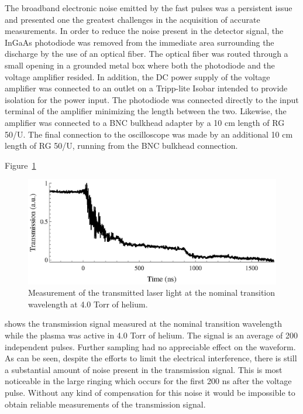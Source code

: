 The broadband electronic noise emitted by the fast pulses was a persistent issue
and presented one the greatest challenges in the acquisition of accurate
measurements. In order to reduce the noise present in the detector signal, the
InGaAs photodiode was removed from the immediate area surrounding the discharge
by the use of an optical fiber. The optical fiber was routed through a small
opening in a grounded metal box where both the photodiode and the voltage
amplifier resided. In addition, the DC power supply of the voltage amplifier was
connected to an outlet on a Tripp-lite Isobar intended to provide isolation for
the power input. The photodiode was connected directly to the input terminal of
the amplifier minimizing the length between the two. Likewise, the amplifier was
connected to a BNC bulkhead adapter by a 10 cm length of RG 50/U. The final
connection to the oscilloscope was made by an additional 10 cm length of RG
50/U, running from the BNC bulkhead connection.

Figure~\ref{fig:transmitted}
\begin{figure}
  \centering
  \includegraphics{./chapters/metastables/figures/transmitted.eps}
  \caption{Measurement of the transmitted laser light at the nominal transition
  wavelength at 4.0 Torr of helium.}
  \label{fig:transmitted}
\end{figure}
shows the transmission signal measured at the nominal transition wavelength
while the plasma was active in 4.0 Torr of helium. The signal is an average of
200 independent pulses. Further sampling had no appreciable effect on the
waveform. As can be seen, despite the efforts to limit the electrical
interference, there is still a substantial amount of noise present in the
transmission signal. This is most noticeable in the large ringing which occurs
for the first 200 ns after the voltage pulse. Without any kind of compensation
for this noise it would be impossible to obtain reliable measurements of the
transmission signal.

